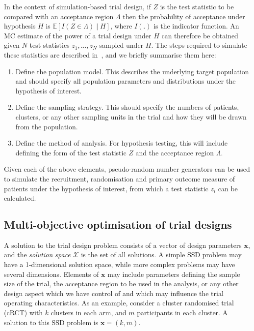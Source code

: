 \documentclass{article} %
\begin{document}
In the context of simulation-based trial design, if $Z$ is the test statistic to be compared with an acceptance region $\Lambda$ then the probability of acceptance under hypothesis $H$ is $\mathbb{E}[I(Z \in \Lambda) \mid H]$, where $I(.)$ is the indicator function. An MC estimate of the power of a trial design under $H$ can therefore be obtained given $N$ test statistics $z_{1}, \ldots , z_{N}$ sampled under $H$. The steps required to simulate these statistics are described in~\cite{Landau2013}, and we briefly summarise them here:
\begin{enumerate}
\item Define the population model. This describes the underlying target population and should specify all population parameters and distributions under the hypothesis of interest.
\item Define the sampling strategy. This should specify the numbers of patients, clusters, or any other sampling units in the trial and how they will be drawn from the population.
\item Define the method of analysis. For hypothesis testing, this will include defining the form of the test statistic $Z$ and the acceptance region $\Lambda$.
\end{enumerate}
Given each of the above elements, pseudo-random number generators can be used to simulate the recruitment, randomisation and primary outcome measure of patients under the hypothesis of interest, from which a test statistic $z_{i}$ can be calculated. 

\subsection{Multi-objective optimisation of trial designs}\label{sec:optimisation}

A solution to the trial design problem consists of a vector of design parameters $\mathbf{x}$, and the \emph{solution space} $\mathcal{X}$ is the set of all solutions. A simple SSD problem may have a 1-dimensional solution space, while more complex problems may have several dimensions. Elements of $\mathbf{x}$ may include parameters defining the sample size of the trial, the acceptance region to be used in the analysis, or any other design aspect which we have control of and which may influence the trial operating characteristics. As an example, consider a cluster randomised trial (cRCT) with $k$ clusters in each arm, and $m$ participants in each cluster. A solution to this SSD problem is $\mathbf{x} = (k, m)$.
\end{document}

